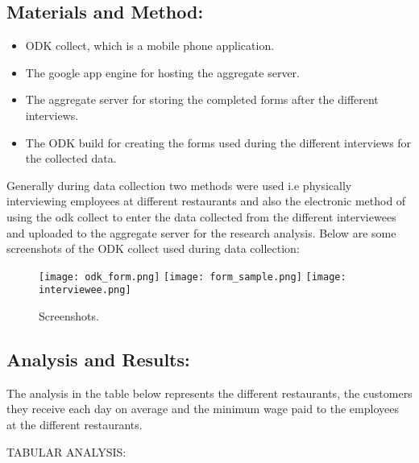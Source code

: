 \documentclass{article}
\begin{document}
  \begin{center}
\section{  Materials and Method:}
\vspace{5mm}
\begin{itemize}
\item ODK collect, which is a mobile phone application.
\end{itemize}
\begin{itemize}
\item The google app engine for hosting the aggregate server.
\end{itemize}
\begin{itemize}
\item The aggregate server for storing the completed forms after the different interviews.
\end{itemize}
\begin{itemize}
\item The ODK build for creating the forms used during the different interviews for the collected data.
\end{itemize}
Generally during data collection two methods were used i.e physically interviewing employees at different restaurants and also the electronic method of using the odk collect to enter the data
collected from the different interviewees and uploaded to the aggregate server for the research analysis.
Below are some screenshots of the ODK collect used during data collection:

\begin{figure}
\texttt{[image: odk\_form.png]}
\texttt{[image: form\_sample.png]}
\texttt{[image: interviewee.png]}
\caption{Screenshots.}
\label{fig: Screenshots}
\end{figure}
\end{center}
\begin{center}
\section{  Analysis and Results:}
\vspace{5mm}
The analysis in the table below represents the different restaurants, the customers they receive each day on average and the minimum wage paid to the employees at the different restaurants.
\end{center}
TABULAR ANALYSIS:
\\
\\
\end{document}
